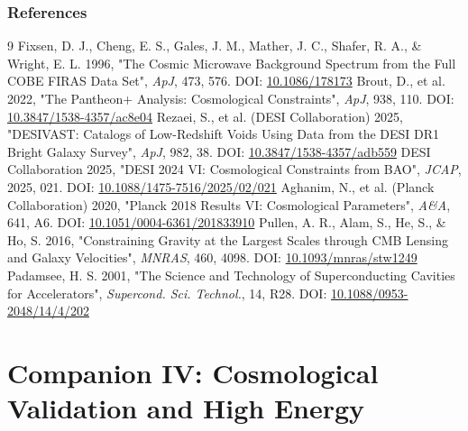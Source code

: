 \documentclass[11pt,a4paper]{article}
\begin{document}
\section{References}
\begin{thebibliography}{9}
 Fixsen, D. J., Cheng, E. S., Gales, J. M., Mather, J. C., Shafer, R. A., \& Wright, E. L. 1996, "The Cosmic Microwave Background Spectrum from the Full COBE FIRAS Data Set", \emph{ApJ}, 473, 576. DOI: \href{https://doi.org/10.1086/178173}{10.1086/\allowbreak{}178173}
 Brout, D., et al. 2022, "The Pantheon+ Analysis: Cosmological Constraints", \emph{ApJ}, 938, 110. DOI: \href{https://doi.org/10.3847/1538-4357/ac8e04}{10.3847/\allowbreak{}1538-4357/\allowbreak{}ac8e04}
 Rezaei, S., et al. (DESI Collaboration) 2025, "DESIVAST: Catalogs of Low-Redshift Voids Using Data from the DESI DR1 Bright Galaxy Survey", \emph{ApJ}, 982, 38. DOI: \href{https://doi.org/10.3847/1538-4357/adb559}{10.3847/\allowbreak{}1538-4357/\allowbreak{}adb559}
 DESI Collaboration 2025, "DESI 2024 VI: Cosmological Constraints from BAO", \emph{JCAP}, 2025, 021. DOI: \href{https://doi.org/10.1088/1475-7516/2025/02/021}{10.1088/\allowbreak{}1475-7516/\allowbreak{}2025/\allowbreak{}02/\allowbreak{}021}
 Aghanim, N., et al. (Planck Collaboration) 2020, "Planck 2018 Results VI: Cosmological Parameters", \emph{A\&A}, 641, A6. DOI: \href{https://doi.org/10.1051/0004-6361/201833910}{10.1051/\allowbreak{}0004-6361/\allowbreak{}201833910}
 Pullen, A. R., Alam, S., He, S., \& Ho, S. 2016, "Constraining Gravity at the Largest Scales through CMB Lensing and Galaxy Velocities", \emph{MNRAS}, 460, 4098. DOI: \href{https://doi.org/10.1093/mnras/stw1249}{10.1093/\allowbreak{}mnras/\allowbreak{}stw1249}
 Padamsee, H. S. 2001, "The Science and Technology of Superconducting Cavities for Accelerators", \emph{Supercond. Sci. Technol.}, 14, R28. DOI: \href{https://doi.org/10.1088/0953-2048/14/4/202}{10.1088/\allowbreak{}0953-2048/\allowbreak{}14/\allowbreak{}4/\allowbreak{}202}
\end{thebibliography}



\part{Companion IV: Cosmological Validation and High Energy}
\end{document}
